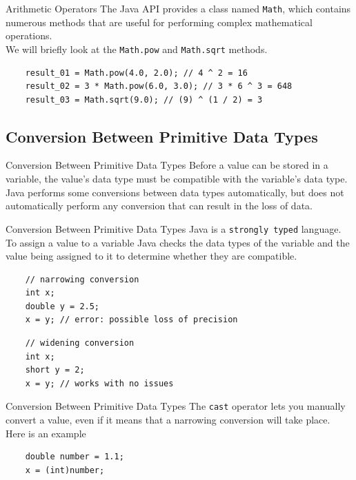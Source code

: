 \documentclass[11pt]{beamer}
\begin{document}
\begin{frame}[fragile]{Arithmetic Operators}
    The Java API provides a class named \texttt{Math}, which contains numerous methods that are useful for performing complex mathematical operations. \\ \vspace{1em}
    We will briefly look at the \texttt{Math.pow} and \texttt{Math.sqrt} methods.
    \begin{lstlisting}
    result_01 = Math.pow(4.0, 2.0); // 4 ^ 2 = 16
    result_02 = 3 * Math.pow(6.0, 3.0); // 3 * 6 ^ 3 = 648
    result_03 = Math.sqrt(9.0); // (9) ^ (1 / 2) = 3
    \end{lstlisting}
\end{frame}

\subsection{Conversion Between Primitive Data Types}
\begin{frame}[fragile]{Conversion Between Primitive Data Types}
    Before a value can be stored in a variable, the value's data type must be compatible with the variable's data type. \\ \vspace{1em}
    Java performs some conversions between data types automatically, but does not automatically perform any conversion that can result in the loss of data.
\end{frame}

\begin{frame}[fragile]{Conversion Between Primitive Data Types}
    Java is a \texttt{strongly typed} language. \\ \vspace{1em}
    To assign a value to a variable Java checks the data types of the variable and the value being assigned to it to determine whether they are compatible.
    \begin{lstlisting}
    // narrowing conversion
    int x;
    double y = 2.5;
    x = y; // error: possible loss of precision
    \end{lstlisting}

    \begin{lstlisting}
    // widening conversion
    int x;
    short y = 2;
    x = y; // works with no issues
    \end{lstlisting}
\end{frame}

\begin{frame}[fragile]{Conversion Between Primitive Data Types}
    The \texttt{cast} operator lets you manually convert a value, even if it means that a
    narrowing conversion will take place. \\ \vspace{1em}
    Here is an example
    \begin{lstlisting}
    double number = 1.1;
    x = (int)number;
    \end{lstlisting}
\end{frame}
\end{document}
